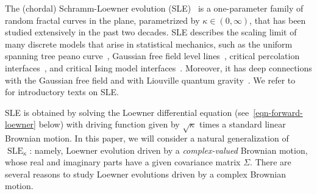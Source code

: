 \documentclass[11pt]{article}
\theoremstyle{plain}
\theoremstyle{definition}
\numberwithin{equation}{section}
\newcommand{\SLE}{{\operatorname{SLE}}_\kappa}
\begin{document}
The (chordal) Schramm-Loewner evolution (SLE)~\cite{schramm0} is a one-parameter family of random fractal curves in the plane, parametrized by $\kappa \in (0,\infty)$, that has been studied extensively in the past two decades. SLE describes the scaling limit of many discrete models that arise in statistical mechanics, such as the uniform spanning tree peano curve~\cite{lsw-lerw-ust}, Gaussian free field level lines~\cite{ss-contour}, critical percolation interfaces~\cite{smirnov-cardy,camia-newman-sle6}, and critical Ising model interfaces~\cite{smirnov-ising}. 
Moreover, it has deep connections with the Gaussian free field and with Liouville quantum gravity~\cite{ss-contour,dubedat-coupling,ig1,shef-zipper,wedges}. 
We refer to~\cite{lawler-book,bn-sle-notes,werner-notes} for introductory texts on SLE. 

SLE is obtained by solving the Loewner differential equation (see~\eqref{eqn-forward-loewner} below) with driving function given by $\sqrt\kappa$ times a standard linear Brownian motion.  
In this paper, we will consider a natural generalization of $\SLE$: namely, Loewner evolution driven by a \emph{complex-valued} Brownian motion, whose real and imaginary parts have a given covariance matrix $\Sigma$. 
There are several reasons to study Loewner evolutions driven by a complex Brownian motion. 
\end{document}
